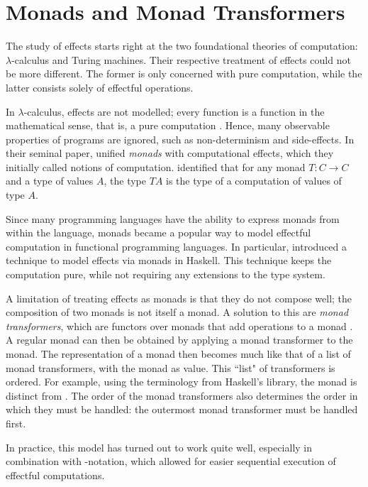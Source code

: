 \section{Monads and Monad Transformers}

The study of effects starts right at the two foundational theories of computation: $\lambda$-calculus and Turing machines. Their respective treatment of effects could not be more different. The former is only concerned with pure computation, while the latter consists solely of effectful operations.

In $\lambda$-calculus, effects are not modelled; every function is a function in the mathematical sense, that is, a pure computation \autocite{moggi_computational_1989}. Hence, many observable properties of programs are ignored, such as non-determinism and side-effects. In their seminal paper, \textcite{moggi_computational_1989} unified \emph{monads} with computational effects, which they initially called notions of computation. \citeauthor{moggi_computational_1989} identified that for any monad $T: C \to C$ and a type of values $A$, the type $T A$ is the type of a computation of values of type $A$.

Since many programming languages have the ability to express monads from within the language, monads became a popular way to model effectful computation in functional programming languages. In particular, \textcite{peyton_jones_imperative_1993} introduced a technique to model effects via monads in Haskell. This technique keeps the computation pure, while not requiring any extensions to the type system.

A limitation of treating effects as monads is that they do not compose well; the composition of two monads is not itself a monad. A solution to this are \emph{monad transformers}, which are functors over monads that add operations to a monad \autocite{moggi_abstract_1989}. A regular monad can then be obtained by applying a monad transformer to the  monad. The representation of a monad then becomes much like that of a list of monad transformers, with the  monad as  value. This ``list" of transformers is ordered. For example, using the terminology from Haskell's  library, the monad  is distinct from . The order of the monad transformers also determines the order in which they must be handled: the outermost monad transformer must be handled first.

In practice, this model has turned out to work quite well, especially in combination with -notation, which allowed for easier sequential execution of effectful computations.

